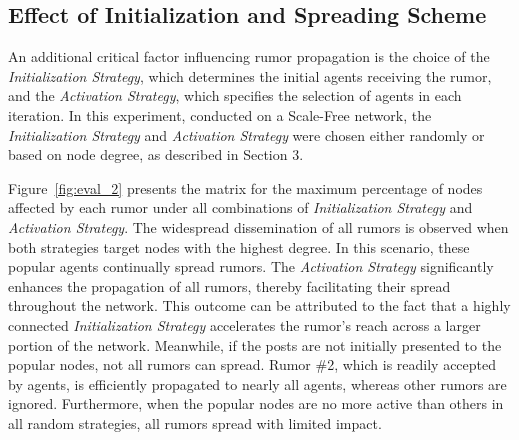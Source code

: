 \subsection{Effect of Initialization and Spreading Scheme} 

An additional critical factor influencing rumor propagation is the choice of the \textit{Initialization Strategy}, which determines the initial agents receiving the rumor, and the \textit{Activation Strategy}, which specifies the selection of agents in each iteration.
In this experiment, conducted on a Scale-Free network, the \textit{Initialization Strategy} and \textit{Activation Strategy} were chosen either randomly or based on node degree, as described in Section 3.

Figure~\ref{fig:eval_2} presents the matrix for the maximum percentage of nodes affected by each rumor under all combinations of \textit{Initialization Strategy} and \textit{Activation Strategy}.
The widespread dissemination of all rumors is observed when both strategies target nodes with the highest degree. 
In this scenario, these popular agents continually spread rumors. The \textit{Activation Strategy} significantly enhances the propagation of all rumors, thereby facilitating their spread throughout the network. 
This outcome can be attributed to the fact that a highly connected \textit{Initialization Strategy} accelerates the rumor’s reach across a larger portion of the network. 
Meanwhile, if the posts are not initially presented to the popular nodes, not all rumors can spread. 
Rumor \#2, which is readily accepted by agents, is efficiently propagated to nearly all agents, whereas other rumors are ignored. 
Furthermore, when the popular nodes are no more active than others in all random strategies, all rumors spread with limited impact.



